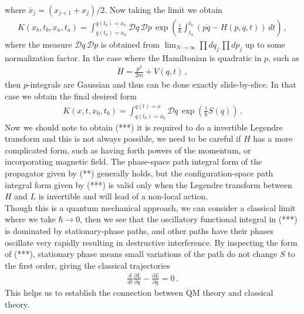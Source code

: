 \documentclass[11pt, onesided]{book}
\theoremstyle{break}
\theoremstyle{break}
\newcommand{\pd}{\partial}
\begin{document}
where $\bar{x}_j = (x_{j+1} +x_j)/2$. Now taking the limit we obtain
\begin{align*}
K(x_b, t_b, x_a,t_a) = \int_{q(t_a)=x_a}^{q(t_b) = x_b} \mathcal{D}q\, \mathcal{D}p\,\exp\left(\frac{i}{\hbar}\int_{t_a}^{t_b}\left(p\dot{q} - H(p,q,t)\right) \, dt\right)\,,\tag{**}
\end{align*}
where the measure $\mathcal{D}q\, \mathcal{D}p$ is obtained from $\lim_{N\to \infty} \prod dq_j\, \prod dp_j$ up to some normalization factor. In the case where the Hamiltonian is quadratic in $p$, such as
\begin{align*}
H = \frac{p^2}{2m} + V(q,t)\,,
\end{align*}
then $p$-integrals are Gaussian and thus can be done exactly slide-by-slice. In that case we obtain the final desired form
\begin{align*}
K(x,t,x_0,t_0) = \int_{q(t_0) = x_0}^{q(t) = x} \mathcal{D}q \, \exp\left( \frac{i}{\hbar}S(q)\right)\,. \tag{***}
\end{align*}
Now we should note to obtain (***) it is required to do a invertible Legendre transform and this is not always possible, we need to be careful if $H$ has a more complicated form, such as having forth powers of the momentum, or incorporating magnetic field. The phase-space path integral form of the propagator given by (**) generally holds, but the configuration-space path integral form given by (***) is valid only when the Legendre transform between $H$ and $L$ is invertible and will lead of a non-local action.\\


Though this is a quantum mechanical approach, we can consider a classical limit where we take $\hbar \to 0$, then we see that the oscillatory functional integral in (***) is dominated by stationary-phase paths, and other paths have their phases oscillate very rapidly resulting in destructive interference. By inspecting the form of (***), stationary phase means small variations of the path do not change $S$ to the first order, giving the classical trajectories 
\begin{align*}
\frac{d}{dt}\frac{\pd L}{\pd \dot{q}} - \frac{\pd L}{\pd q}= 0\,.
\end{align*}
This helps us to establish the connection between QM theory and classical theory. 
\end{document}
